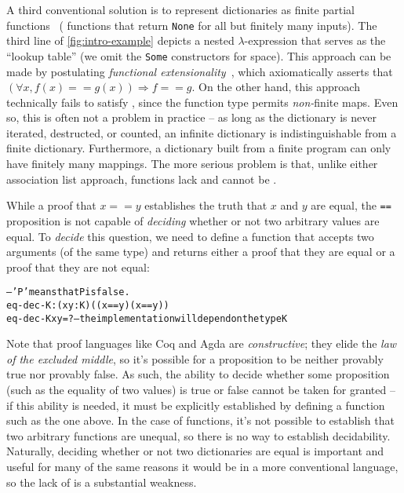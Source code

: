 A third conventional solution is to represent dictionaries as finite partial functions~\cite[Maps]{Pierce:SF1} (\ie{} functions that return \texttt{None} for all but finitely many inputs).
%
The third line of \autoref{fig:intro-example} depicts a nested $\lambda$-expression that serves as the ``lookup table'' (we omit the \texttt{Some} constructors for space).
%
This approach can be made \extensional{} by postulating \emph{functional extensionality}~\mbox{\cite[Logic]{Pierce:SF1}}, which axiomatically asserts that $(\forall x, f(x) == g(x)) \Rightarrow f == g$.
%
On the other hand, this approach technically fails to satisfy \SemTot, since the function type permits \emph{non-}finite maps.
%
Even so, this is often not a problem in practice -- as long as the dictionary is never iterated, destructed, or counted, an infinite dictionary is indistinguishable from a finite dictionary.
%
Furthermore, a dictionary built from a finite program can only have finitely many mappings.
%
The more serious problem is that, unlike either association list approach, functions lack \firstUseGoal{\DecidableEq} and cannot be \firstUseGoal{\destructed}.

While a proof that $x == y$ establishes the truth that $x$ and $y$ are equal, the \texttt{==} proposition is not capable of \emph{deciding} whether or not two arbitrary values are equal.
%
To \emph{decide} this question, we need to define a function that accepts two arguments (of the same type) and returns either a proof that they are equal or a proof that they are not equal:
\begin{alltt}
  -- 'P \altRArr \altBot' means that P is false.
  eq-dec-K : (x y : K) \altRArr ((x == y) \altOr (x == y \altRArr \altBot))
  eq-dec-K x y = ?  --  the implementation will depend on the type K
\end{alltt}

Note that proof languages like Coq and Agda are \emph{constructive}; they elide the \emph{law of the excluded middle}, so it's possible for a proposition to be neither provably true nor provably false.
%
As such, the ability to decide whether some proposition (such as the equality of two values) is true or false cannot be taken for granted -- if this ability is needed, it must be explicitly established by defining a function such as the one above.
%
In the case of functions, it's not possible to establish that two arbitrary functions are unequal, so there is no way to establish decidability.
%
Naturally, deciding whether or not two dictionaries are equal is important and useful for many of the same reasons it would be in a more conventional language, so the lack of \DecidableEq{} is a substantial weakness.

